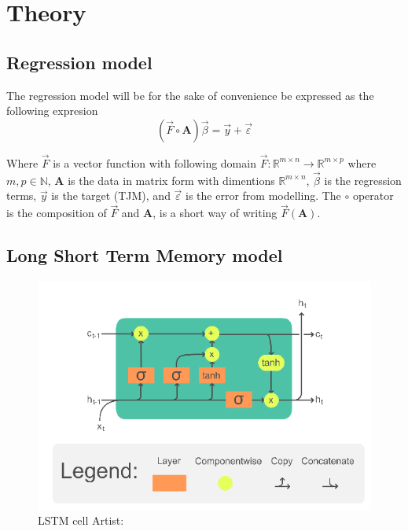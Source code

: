 \section{Theory}\label{sec:theory}

\subsection{Regression model}

The regression model will be for the sake of convenience be expressed as the following expresion
$$
\left(\vec{F}\circ \mathbf{A}\right)\vec{\beta}=\vec{y}+\vec{\varepsilon}
$$

Where $\vec{F}$ is a vector function with following domain $\vec{F}:\mathbb{R}^{m\times n}\to \mathbb{R}^{m\times p}$ where $m,p\in \mathbb{N}$, $\mathbf{A}$ is the data in matrix form with dimentions $\mathbb{R}^{m\times n}$, $\vec{\beta}$ is the regression terms, $\vec{y}$ is the target (TJM), and $\vec{\varepsilon}$ is the error from modelling. The $\circ$ operator is the composition of $\vec{F}$ and $\mathbf{A}$, is a short way of writing $\vec{F}(\mathbf{A})$.

\subsection{Long Short Term Memory model}

\begin{figure}
	\centering
	\includegraphics[width=0.7\linewidth]{figures/LSTM_Cell}
	\caption{LSTM cell  Artist: \textcite{chevalier_english_2018}}
	\label{fig:lstmcell}
\end{figure}
